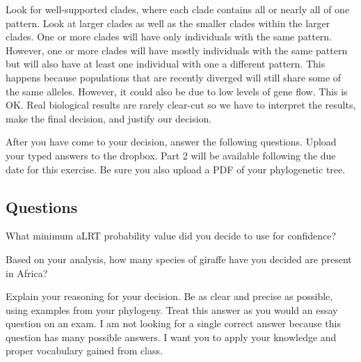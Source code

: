 \documentclass[11pt, addpoints]{exam}
\begin{document}
Look for well-supported clades, where each clade contains all or nearly
all of one pattern. Look at larger clades as well as the smaller clades
within the larger clades. One or more clades will have only individuals
with the same pattern. However, one or more clades will have mostly
individuals with the same pattern but will also have at least one
individual with one a different pattern. This happens because
populations that are recently diverged will still share some of the same
alleles. However, it could also be due to low levels of gene flow. This
is OK. Real biological results are rarely clear-cut so we have to
interpret the results, make the final decision, and justify our
decision.

After you have come to your decision, answer the following questions. 
Upload your typed answers to the dropbox. Part 2 will be available following 
the due date for this exercise. Be sure you also upload a PDF of your phylogenetic tree.


\subsection*{Questions}
\label{sec:questions}

\begin{questions}

\question[1]
What minimum aLRT probability value did you decide to use for
confidence?

\question[1]
Based on your analysis, how many species of giraffe have you decided
are present in Africa? 

\question[10]
Explain your reasoning for your decision. Be as clear and
precise as possible, using examples from your phylogeny. Treat this
answer as you would an essay question on an exam. I am not looking for a
single correct answer because this question has many possible answers. I want you to
apply your knowledge and proper vocabulary gained from class.

\end{questions}
\end{document}
